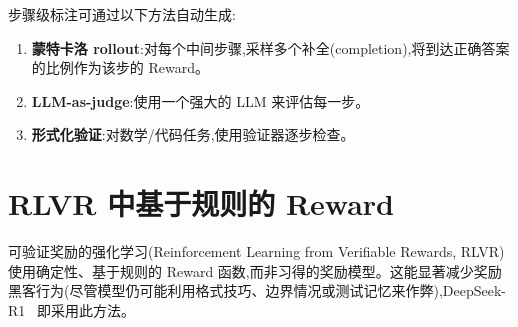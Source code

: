 步骤级标注可通过以下方法自动生成:

\begin{enumerate}
  \item \textbf{蒙特卡洛 rollout}:对每个中间步骤,采样多个补全(completion),将到达正确答案的比例作为该步的 Reward。
  \item \textbf{LLM-as-judge}:使用一个强大的 LLM 来评估每一步。
  \item \textbf{形式化验证}:对数学/代码任务,使用验证器逐步检查。
\end{enumerate}

\section{RLVR 中基于规则的 Reward}
\label{sec:rule-based-rewards}

可验证奖励的强化学习(Reinforcement Learning from Verifiable Rewards, RLVR)使用确定性、基于规则的 Reward 函数,而非习得的奖励模型。这能显著减少奖励黑客行为(尽管模型仍可能利用格式技巧、边界情况或测试记忆来作弊),DeepSeek-R1~\cite{deepseek2025r1} 即采用此方法。

